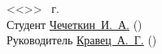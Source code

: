 \documentclass[a4paper, 14pt]{extreport}
\begin{document}
    \pagestyle{empty}
    \vspace{\fill}
    \noindent<<\underline{\hspace{1cm}}>> \underline{\hspace{5cm}} \the\year\ г.\\
    Студент \hspace{1cm} \underline{Чечеткин~И.~А.\hspace{2.85cm}} \hspace{2cm} (\underline{\hspace{5cm}})\\
    Руководитель \underline{Кравец~А.~Г.\hspace{3.42cm}} \hspace{2cm} (\underline{\hspace{5cm}})\\
\end{document}
